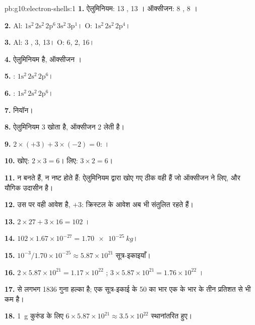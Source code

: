 \begin{solution}{pb:g10:electron-shells:1}
\textbf{1.} ऐलुमिनियम: 13 , 13 । ऑक्सीजन: 8 , 8
।

\textbf{2.} Al: $1\mathrm{s}^2\,2\mathrm{s}^2\,2\mathrm{p}^6\,3\mathrm{s}^2\,3\mathrm{p}^1$।
O: $1\mathrm{s}^2\,2\mathrm{s}^2\,2\mathrm{p}^4$।

\textbf{3.} Al: 3 ,  3,  13। O: 6,  2,
 16।

\textbf{4.} ऐलुमिनियम  है, ऑक्सीजन ।

\textbf{5.} : $1\mathrm{s}^2\,2\mathrm{s}^2\,2\mathrm{p}^6$।

\textbf{6.} : $1\mathrm{s}^2\,2\mathrm{s}^2\,2\mathrm{p}^6$।

\textbf{7.} नियॉन।

\textbf{8.} ऐलुमिनियम 3 खोता है, ऑक्सीजन 2 लेती है।

\textbf{9.} $2 \times (+3) + 3 \times (-2) = 0$: ।

\textbf{10.} खोए: $2 \times 3 = 6$। लिए: $3 \times 2 = 6$।

\textbf{11.}  न बनते हैं, न नष्ट होते हैं: ऐलुमिनियम द्वारा खोए गए ठीक
वही हैं जो ऑक्सीजन ने लिए, और यौगिक
उदासीन है।

\textbf{12.} उस पर वही आवेश है, $+3$: क्रिस्टल के आवेश अब भी
संतुलित रहते हैं।

\textbf{13.} $2 \times 27 + 3 \times 16 = 102$ ।

\textbf{14.} $102 \times 1.67 \times 10^{-27} = \qty{1.70e-25}{kg}$।

\textbf{15.} $10^{-3} / 1.70 \times 10^{-25} \approx 5.87 \times 10^{21}$
सूत्र-इकाइयाँ।

\textbf{16.} $2 \times 5.87 \times 10^{21} = 1.17 \times 10^{22}$
 ; $3 \times 5.87 \times 10^{21} = 1.76 \times 10^{22}$
 ।

\textbf{17.}   से लगभग 1836 गुना हल्का है; एक सूत्र-इकाई के
50  का भार एक  के भार के तीन प्रतिशत से भी
कम है।

\textbf{18.} \qty{1}{g} कुरुंड के लिए $6 \times 5.87 \times 10^{21} \approx 3.5 \times 10^{22}$
 स्थानांतरित हुए।
\end{solution}
